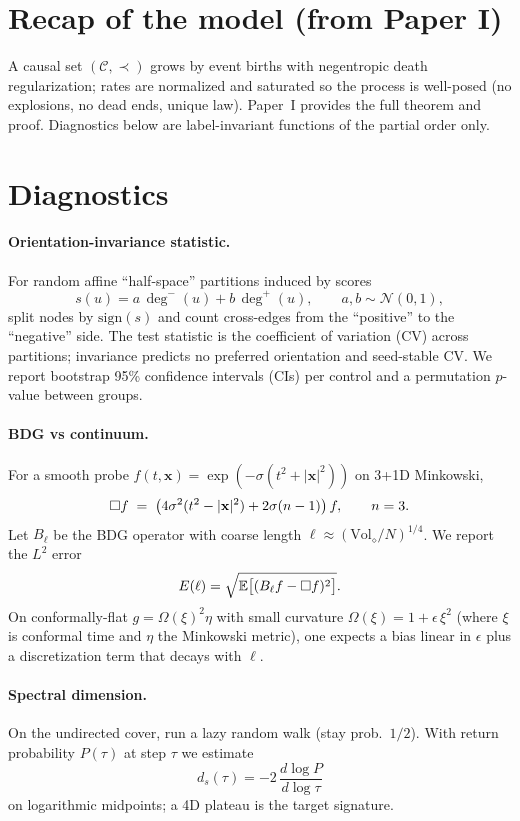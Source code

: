 \section{Recap of the model (from Paper I)}
A causal set $(\mathcal{C},\prec)$ grows by event births with negentropic death regularization; rates are normalized and saturated so the process is well-posed (no explosions, no dead ends, unique law). Paper~I provides the full theorem and proof.
Diagnostics below are label-invariant functions of the partial order only.

\section{Diagnostics}
\paragraph{Orientation-invariance statistic.}
For random affine ``half-space'' partitions induced by scores
\[
s(u)=a\,\deg^{-}(u)+b\,\deg^{+}(u),\qquad a,b\sim\mathcal{N}(0,1),
\]
split nodes by $\mathrm{sign}(s)$ and count cross-edges from the ``positive'' to the ``negative'' side.
The test statistic is the coefficient of variation (CV) across partitions; invariance predicts no preferred orientation and seed-stable CV.
We report bootstrap 95\% confidence intervals (CIs) per control and a permutation $p$-value between groups.

\paragraph{BDG vs continuum.}
For a smooth probe $f(t,\mathbf{x})=\exp(-\sigma(t^2+|\mathbf{x}|^2))$ on 3+1D Minkowski,
\[
\Box f \;=\; \big(4\sigma^2(t^2-|\mathbf{x}|^2)+2\sigma(n-1)\big)\,f,\qquad n=3.
\]
Let $B_\ell$ be the BDG operator with coarse length $\ell\approx (\mathrm{Vol}_\diamond/N)^{1/4}$.
We report the $L^2$ error
\[
E(\ell)=\sqrt{\mathbb{E}\big[(B_\ell f-\Box f)^2\big]}.
\]
On conformally-flat $g=\Omega(\xi)^2\eta$ with small curvature $\Omega(\xi)=1+\epsilon\,\xi^2$ (where $\xi$ is conformal time and $\eta$ the Minkowski metric),
one expects a bias linear in $\epsilon$ plus a discretization term that decays with $\ell$.

\paragraph{Spectral dimension.}
On the undirected cover, run a lazy random walk (stay prob.\ $1/2$).
With return probability $P(\tau)$ at step $\tau$ we estimate
\[
d_s(\tau)=-2\,\frac{d\log P}{d\log \tau}
\]
on logarithmic midpoints; a 4D plateau is the target signature.

